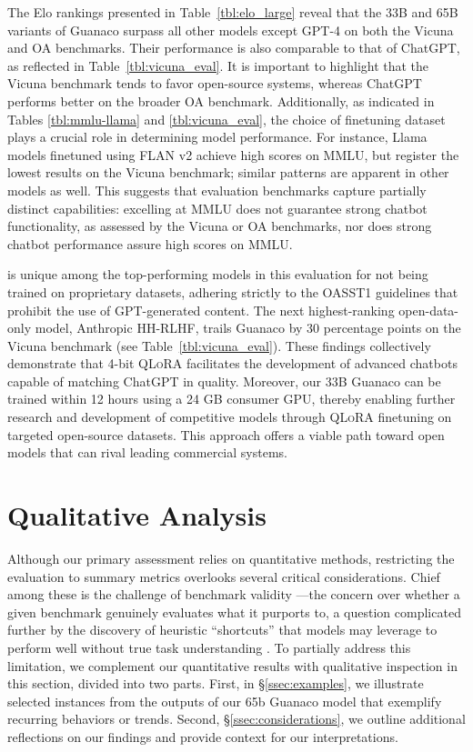 The Elo rankings presented in Table~\ref{tbl:elo_large} reveal that the 33B and 65B variants of {Guanaco} surpass all other models except GPT-4 on both the Vicuna and OA benchmarks. Their performance is also comparable to that of ChatGPT, as reflected in Table~\ref{tbl:vicuna_eval}. It is important to highlight that the Vicuna benchmark tends to favor open-source systems, whereas ChatGPT performs better on the broader OA benchmark. Additionally, as indicated in Tables \ref{tbl:mmlu-llama} and \ref{tbl:vicuna_eval}, the choice of finetuning dataset plays a crucial role in determining model performance. For instance, Llama models finetuned using FLAN v2 achieve high scores on MMLU, but register the lowest results on the Vicuna benchmark; similar patterns are apparent in other models as well. This suggests that evaluation benchmarks capture partially distinct capabilities: excelling at MMLU does not guarantee strong chatbot functionality, as assessed by the Vicuna or OA benchmarks, nor does strong chatbot performance assure high scores on MMLU.

 is unique among the top-performing models in this evaluation for not being trained on proprietary datasets, adhering strictly to the OASST1 guidelines that prohibit the use of GPT-generated content. The next highest-ranking open-data-only model, Anthropic HH-RLHF, trails {Guanaco} by 30 percentage points on the Vicuna benchmark (see Table~\ref{tbl:vicuna_eval}). These findings collectively demonstrate that 4-bit \textsc{QLoRA} facilitates the development of advanced chatbots capable of matching ChatGPT in quality. Moreover, our 33B {Guanaco} can be trained within 12 hours using a 24 GB consumer GPU, thereby enabling further research and development of competitive models through \textsc{QLoRA} finetuning on targeted open-source datasets. This approach offers a viable path toward open models that can rival leading commercial systems.

\section{Qualitative Analysis}

Although our primary assessment relies on quantitative methods, restricting the evaluation to summary metrics overlooks several critical considerations. Chief among these is the challenge of benchmark validity \citep{liao2021we}—the concern over whether a given benchmark genuinely evaluates what it purports to, a question complicated further by the discovery of heuristic ``shortcuts'' that models may leverage to perform well without true task understanding \citep{gururangan2018annotation, poliak2018hypothesis}. To partially address this limitation, we complement our quantitative results with qualitative inspection in this section, divided into two parts. First, in \S\ref{ssec:examples}, we illustrate selected instances from the outputs of our 65b {Guanaco} model that exemplify recurring behaviors or trends. Second, \S\ref{ssec:considerations}, we outline additional reflections on our findings and provide context for our interpretations.

